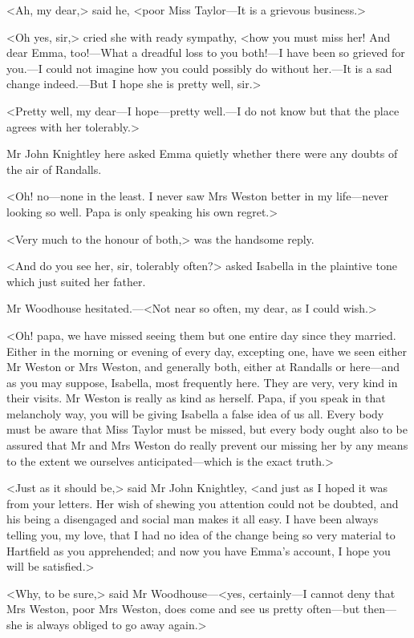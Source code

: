 <Ah, my dear,> said he, <poor Miss Taylor—It is a grievous business.>

<Oh yes, sir,> cried she with ready sympathy, <how you must miss her! And dear Emma, too!—What a dreadful loss to you both!—I have been so grieved for you.—I could not imagine how you could possibly do without her.—It is a sad change indeed.—But I hope she is pretty well, sir.>

<Pretty well, my dear—I hope—pretty well.—I do not know but that the place agrees with her tolerably.>

Mr John Knightley here asked Emma quietly whether there were any doubts of the air of Randalls.

<Oh! no—none in the least. I never saw Mrs Weston better in my life—never looking so well. Papa is only speaking his own regret.>

<Very much to the honour of both,> was the handsome reply.

<And do you see her, sir, tolerably often?> asked Isabella in the plaintive tone which just suited her father.

Mr Woodhouse hesitated.—<Not near so often, my dear, as I could wish.>

<Oh! papa, we have missed seeing them but one entire day since they married. Either in the morning or evening of every day, excepting one, have we seen either Mr Weston or Mrs Weston, and generally both, either at Randalls or here—and as you may suppose, Isabella, most frequently here. They are very, very kind in their visits. Mr Weston is really as kind as herself. Papa, if you speak in that melancholy way, you will be giving Isabella a false idea of us all. Every body must be aware that Miss Taylor must be missed, but every body ought also to be assured that Mr and Mrs Weston do really prevent our missing her by any means to the extent we ourselves anticipated—which is the exact truth.>

<Just as it should be,> said Mr John Knightley, <and just as I hoped it was from your letters. Her wish of shewing you attention could not be doubted, and his being a disengaged and social man makes it all easy. I have been always telling you, my love, that I had no idea of the change being so very material to Hartfield as you apprehended; and now you have Emma's account, I hope you will be satisfied.>

<Why, to be sure,> said Mr Woodhouse—<yes, certainly—I cannot deny that Mrs Weston, poor Mrs Weston, does come and see us pretty often—but then—she is always obliged to go away again.>

